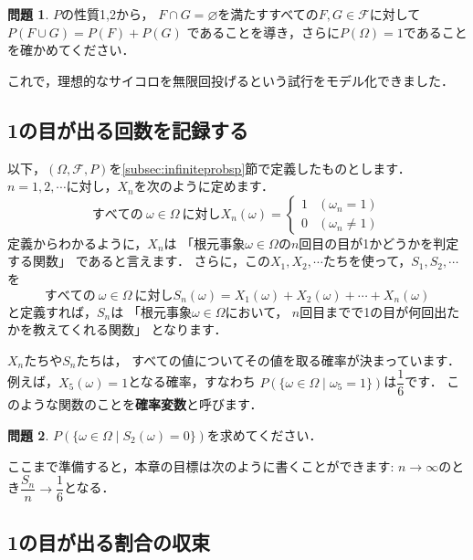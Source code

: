 \documentclass[./main]{subfiles} %
\theoremstyle{definition}
\newtheorem{hamadadefi}{定義}[Section]
\newtheorem{hamadaqst}[hamadadefi]{問題}
\begin{document}
\begin{hamadaqst}\label{checkofadditivity}
$P$の性質1,2から，
$F\cap G=\varnothing$を満たすすべての$F,G\in\mathcal{F}$に対して
$P(F\cup G)=P(F)+P(G)$
であることを導き，さらに$P(\Omega)=1$であることを確かめてください．
\end{hamadaqst}

これで，理想的なサイコロを無限回投げるという試行をモデル化できました．


\subsection{1の目が出る回数を記録する}\label{randomvariable}

以下，$(\Omega,\mathcal{F},P)$を\ref{subsec:infiniteprobsp}節で定義したものとします．
$n=1,2,\cdots$に対し，$X_n$を次のように定めます．
\[ すべての\ \omega\in\Omega\ に対しX_n(\omega)=
\begin{cases}1 & (\omega_n=1) \\ 0 & (\omega_n\neq1)\end{cases} \]
定義からわかるように，$X_n$は
「根元事象$\omega\in\Omega$の$n$回目の目が1かどうかを判定する関数」
であると言えます．
さらに，この$X_1,X_2,\cdots$たちを使って，$S_1,S_2,\cdots$を
\[ すべての\ \omega\in\Omega\ に対し
S_n(\omega)=X_1(\omega)+X_2(\omega)+\cdots+X_n(\omega) \]
と定義すれば，$S_n$は
「根元事象$\omega\in\Omega$において，
$n$回目までで1の目が何回出たかを教えてくれる関数」
となります．

$X_n$たちや$S_n$たちは，
すべての値についてその値を取る確率が決まっています．
例えば，$X_5(\omega)=1$となる確率，すなわち
$P(\{\omega\in\Omega\mid\omega_5=1\})$は$\dfrac{1}{6}$です．
このような関数のことを\textbf{確率変数}と呼びます．

\begin{hamadaqst}\label{checkofrandomvariable}
$P(\{\omega\in\Omega\mid S_2(\omega)=0\})$を求めてください．
\end{hamadaqst}

ここまで準備すると，本章の目標は次のように書くことができます:
$n\to\infty$のとき$\dfrac{S_n}{n}\to\dfrac{1}{6}$となる．

\subsection{1の目が出る割合の収束}\label{subsec:LOLN}
\end{document}
